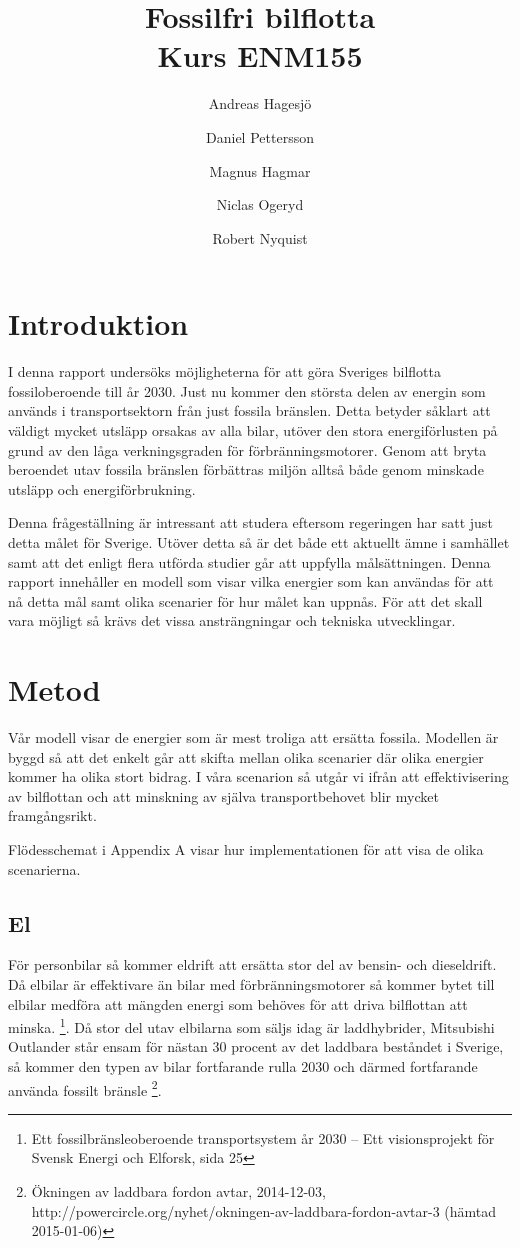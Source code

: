 \documentclass[a4paper,11pt,fleqn, titlepage]{article}
\author{Andreas Hagesjö \and Daniel Pettersson \and
Magnus Hagmar \and Niclas Ogeryd \and Robert Nyquist}
\title{Fossilfri bilflotta \\ Kurs ENM155}
\begin{document}
\maketitle

\section{Introduktion}
I denna rapport undersöks möjligheterna för att göra Sveriges bilflotta
fossiloberoende till år 2030. Just nu kommer den största delen av energin
som används i transportsektorn från just fossila bränslen. Detta betyder
såklart att väldigt mycket utsläpp orsakas av alla bilar, utöver den stora
energiförlusten på grund av den låga verkningsgraden för
förbränningsmotorer. Genom att bryta beroendet utav fossila bränslen
förbättras miljön alltså både genom minskade utsläpp och energiförbrukning.

Denna frågeställning är intressant att studera eftersom regeringen har satt
just detta målet för Sverige. Utöver detta så är det både ett aktuellt ämne
i samhället samt att det enligt flera utförda studier går att uppfylla
målsättningen. Denna rapport innehåller en modell som visar vilka energier
som kan användas för att nå detta mål samt olika scenarier för hur målet
kan uppnås. För att det skall vara möjligt så krävs det vissa
ansträngningar och tekniska utvecklingar.

\section{Metod}

Vår modell visar de energier som är mest troliga att ersätta fossila.
Modellen är byggd så att det enkelt går att skifta mellan olika scenarier
där olika energier kommer ha olika stort bidrag. I våra scenarion så utgår
vi ifrån att effektivisering av bilflottan och att minskning av själva
transportbehovet blir mycket framgångsrikt.


Flödesschemat i Appendix A visar hur implementationen för att visa de olika
scenarierna.

\subsection{El}

För personbilar så kommer eldrift att ersätta stor del av bensin- och
dieseldrift. Då elbilar är effektivare än bilar med förbränningsmotorer så
kommer bytet till elbilar medföra att mängden energi som behöves för att
driva bilflottan att minska. \footnote{Ett fossilbränsleoberoende
transportsystem år 2030 – Ett visionsprojekt för Svensk Energi och Elforsk,
sida 25}. Då stor del utav elbilarna som säljs idag är laddhybrider,
Mitsubishi Outlander står ensam för nästan 30 procent av det laddbara
beståndet i Sverige, så kommer den typen av bilar fortfarande rulla 2030
och därmed fortfarande använda fossilt bränsle
\footnote{Ökningen av laddbara fordon avtar, 2014-12-03,
\\ http://powercircle.org/nyhet/okningen-av-laddbara-fordon-avtar-3 (hämtad
2015-01-06)}.
\end{document}
